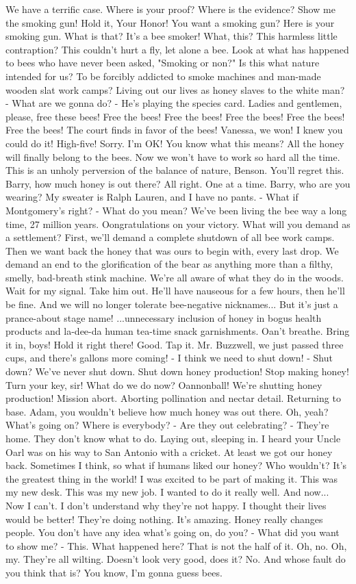 \documentclass{article}
\begin{document}
We have a terrific case. Where is your proof? Where is the evidence? Show me the smoking gun! Hold it, Your Honor! You want a smoking gun? Here is your smoking gun. What is that? It's a bee smoker! What, this? This harmless little contraption? This couldn't hurt a fly, let alone a bee. Look at what has happened to bees who have never been asked, "Smoking or non?" Is this what nature intended for us? To be forcibly addicted to smoke machines and man-made wooden slat work camps? Living out our lives as honey slaves to the white man? - What are we gonna do? - He's playing the species card. Ladies and gentlemen, please, free these bees! Free the bees! Free the bees! Free the bees! Free the bees! Free the bees! The court finds in favor of the bees! Vanessa, we won! I knew you could do it! High-five! Sorry. I'm OK! You know what this means? All the honey will finally belong to the bees. Now we won't have to work so hard all the time. This is an unholy perversion of the balance of nature, Benson. You'll regret this. Barry, how much honey is out there? All right. One at a time. Barry, who are you wearing? My sweater is Ralph Lauren, and I have no pants. - What if Montgomery's right? - What do you mean? We've been living the bee way a long time, 27 million years. Oongratulations on your victory. What will you demand as a settlement? First, we'll demand a complete shutdown of all bee work camps. Then we want back the honey that was ours to begin with, every last drop. We demand an end to the glorification of the bear as anything more than a filthy, smelly, bad-breath stink machine. We're all aware of what they do in the woods. Wait for my signal. Take him out. He'll have nauseous for a few hours, then he'll be fine. And we will no longer tolerate bee-negative nicknames... But it's just a prance-about stage name! ...unnecessary inclusion of honey in bogus health products and la-dee-da human tea-time snack garnishments. Oan't breathe. Bring it in, boys! Hold it right there! Good. Tap it. Mr. Buzzwell, we just passed three cups, and there's gallons more coming! - I think we need to shut down! - Shut down? We've never shut down. Shut down honey production! Stop making honey! Turn your key, sir! What do we do now? Oannonball! We're shutting honey production! Mission abort. Aborting pollination and nectar detail. Returning to base. Adam, you wouldn't believe how much honey was out there. Oh, yeah? What's going on? Where is everybody? - Are they out celebrating? - They're home. They don't know what to do. Laying out, sleeping in. I heard your Uncle Oarl was on his way to San Antonio with a cricket. At least we got our honey back. Sometimes I think, so what if humans liked our honey? Who wouldn't? It's the greatest thing in the world! I was excited to be part of making it. This was my new desk. This was my new job. I wanted to do it really well. And now... Now I can't. I don't understand why they're not happy. I thought their lives would be better! They're doing nothing. It's amazing. Honey really changes people. You don't have any idea what's going on, do you? - What did you want to show me? - This. What happened here? That is not the half of it. Oh, no. Oh, my. They're all wilting. Doesn't look very good, does it? No. And whose fault do you think that is? You know, I'm gonna guess bees. 
\end{document}

